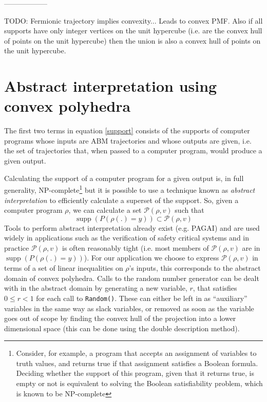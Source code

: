 \documentclass{article}
\DeclareMathOperator\supp{supp}
\begin{document}
------------------

TODO: Fermionic trajectory implies convexity... Leads to convex PMF. Also if all supports have only integer vertices on the unit hypercube (i.e. are the convex hull of points on the unit hypercube) then the union is also a convex hull of points on the unit hypercube.

\section{Abstract interpretation using convex polyhedra}

The first two terms in equation \ref{support} consists of the supports of computer programs whose inputs are ABM trajectories and whose outputs are given, i.e. the set of trajectories that, when passed to a computer program, would produce a given output.

Calculating the support of a computer program for a given output is, in full generality, NP-complete\footnote{Consider, for example, a program that accepts an assignment of variables to truth values, and returns true if that assignment satisfies a Boolean formula. Deciding whether the support of this program, given that it returns true, is empty or not is equivalent to solving the Boolean satisfiability problem, which is known to be NP-complete\cite{cook1971complexity}} but it is possible to use a technique known as \textit{abstract interpretation}\cite{cousot1977abstract} to efficiently calculate a superset of the support. So, given a computer program $\rho$, we can calculate a set $\mathcal{P}(\rho, v)$ such that
\[
\supp(P(\rho(.)=y)) \subset \mathcal{P}(\rho, v)
\]
Tools to perform abstract interpretation already exist (e.g. PAGAI\cite{henry2012pagai}) and are used widely in applications such as the verification of safety critical systems\cite{blanchet2003static} and in practice $\mathcal{P}(\rho, v)$ is often reasonably tight (i.e. most members of $\mathcal{P}(\rho, v)$ are in $\supp(P(\rho(.)=y))$). For our application we choose to express $\mathcal{P}(\rho, v)$ in terms of a set of linear inequalities on $\rho$'s inputs, this corresponds to the abstract domain of convex polyhedra\cite{cousot1978automatic}\cite{becchi2018efficient}. Calls to the random number generator can be dealt with in the abstract domain by generating a new variable, $r$, that satisfies $0 \le r < 1$ for each call to \texttt{Random()}. These can either be left in as ``auxiliary'' variables in the same way as slack variables, or removed as soon as the variable goes out of scope by finding the convex hull of the projection into a lower dimensional space (this can be done using the double description method\cite{motzkin1953double}).
\end{document}
